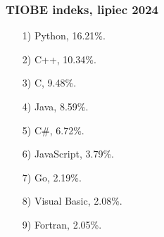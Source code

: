 \documentclass[10pt,t]{beamer}
\begin{document}
\begin{frame}
  \frametitle{TIOBE indeks, lipiec 2024}


  \begin{itemize}

  \item[1)] Python, 16.21\%.



  \item[2)] C++, 10.34\%.



  \item[3)] C, 9.48\%.



  \item[4)] Java, 8.59\%.



  \item[5)] C\#, 6.72\%.




  \item[6)] JavaScript, 3.79\%.




  \item[7)] Go, 2.19\%.




  \item[8)] Visual Basic, 2.08\%.




  \item[9)] Fortran, 2.05\%.

  \end{itemize}

\end{frame}
















\end{document}
